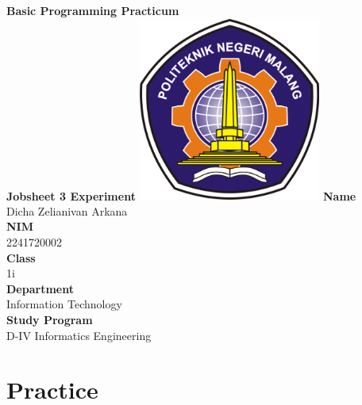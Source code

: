 \documentclass[12pt,titlepage]{article}
\begin{document}
\begin{titlepage}
    \centering
    \vfill
    {\bfseries\LARGE
        Basic Programming Practicum\\
        \vskip0.25cm
        Jobsheet 3 Experiment
    }
    \vfill
    \includegraphics[width=6cm]{images/polinema-logo.png}
    \vfill
    {\textbf{Name}\\
        Dicha Zelianivan Arkana\\
        \vskip0.5cm
        \textbf{NIM}\\
        2241720002\\
        \vskip0.5cm
        \textbf{Class}\\
        1i\\
        \vskip0.5cm
        \textbf{Department}\\
        Information Technology\\
        \vskip0.5cm
        \textbf{Study Program}\\
        D-IV Informatics Engineering}
\end{titlepage}

\section{Practice}
\end{document}
